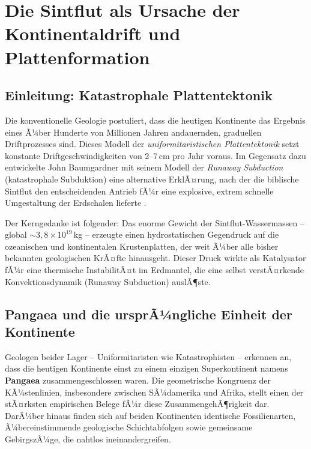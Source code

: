 ﻿\documentclass[12pt,a4paper]{report}
\begin{document}
\chapter{Die Sintflut als Ursache der Kontinentaldrift und Plattenformation}
\label{sec:plattentektonik}

\section{Einleitung: Katastrophale Plattentektonik}

Die konventionelle Geologie postuliert, dass die heutigen Kontinente das Ergebnis eines Ã¼ber Hunderte von Millionen Jahren andauernden, graduellen Driftprozesses sind. Dieses Modell der \textit{uniformitaristischen Plattentektonik} setzt konstante Driftgeschwindigkeiten von 2--7\,cm pro Jahr voraus. Im Gegensatz dazu entwickelte John Baumgardner mit seinem Modell der \textit{Runaway Subduction} (katastrophale Subduktion) eine alternative ErklÃ¤rung, nach der die biblische Sintflut den entscheidenden Antrieb fÃ¼r eine explosive, extrem schnelle Umgestaltung der Erdschalen lieferte \cite{baumgardner1994}.

Der Kerngedanke ist folgender: Das enorme Gewicht der Sintflut-Wassermassen -- global $\sim 3{,}8 \times 10^{19}$\,kg -- erzeugte einen hydrostatischen Gegendruck auf die ozeanischen und kontinentalen Krustenplatten, der weit Ã¼ber alle bisher bekannten geologischen KrÃ¤fte hinausgeht. Dieser Druck wirkte als Katalysator fÃ¼r eine thermische InstabilitÃ¤t im Erdmantel, die eine selbst verstÃ¤rkende Konvektionsdynamik (Runaway Subduction) auslÃ¶ste.

\section{Pangaea und die ursprÃ¼ngliche Einheit der Kontinente}

Geologen beider Lager -- Uniformitaristen wie Katastrophisten -- erkennen an, dass die heutigen Kontinente einst zu einem einzigen Superkontinent namens \textbf{Pangaea} zusammengeschlossen waren. Die geometrische Kongruenz der KÃ¼stenlinien, insbesondere zwischen SÃ¼damerika und Afrika, stellt einen der stÃ¤rksten empirischen Belege fÃ¼r diese ZusammengehÃ¶rigkeit dar. DarÃ¼ber hinaus finden sich auf beiden Kontinenten identische Fossilienarten, Ã¼bereinstimmende geologische Schichtabfolgen sowie gemeinsame GebirgszÃ¼ge, die nahtlos ineinandergreifen.
\end{document}
